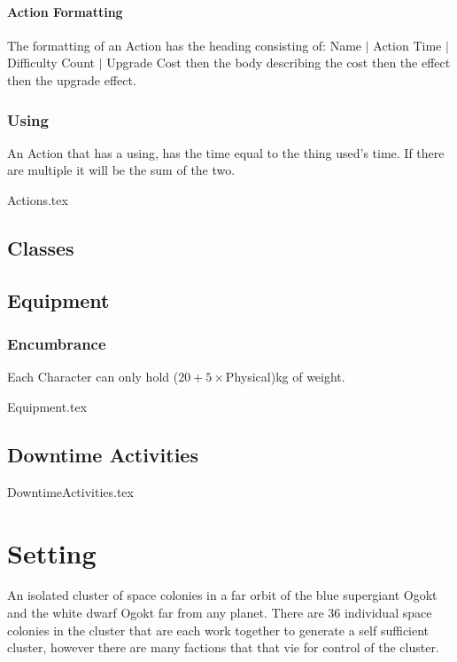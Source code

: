 \documentclass[a4paper,12pt,oneside]{book}
\begin{document}
            \subsubsection{Action Formatting}
                The formatting of an Action has the heading consisting of: Name $\vert$ Action Time $\vert$ Difficulty Count $\vert$ Upgrade Cost then the body describing the cost then the effect then the upgrade effect.

            \subsection{Using}
                An Action that has a using, has the time equal to the thing used's time. If there are multiple it will be the sum of the two.

            {Actions.tex}
                
        \section{Classes}
        \section{Equipment}
            \subsection{Encumbrance}
                Each Character can only hold ($20 + 5\times$Physical)kg of weight.

            {Equipment.tex}
        \section{Downtime Activities}
            {DowntimeActivities.tex}

    \chapter{Setting}
        An isolated cluster of space colonies in a far orbit of the blue supergiant \alpha Ogokt and the white dwarf \beta Ogokt far from any planet. There are 36 individual space colonies in the cluster that are each work together to generate a self sufficient cluster, however there are many factions that that vie for control of the cluster.
        
\end{document}
